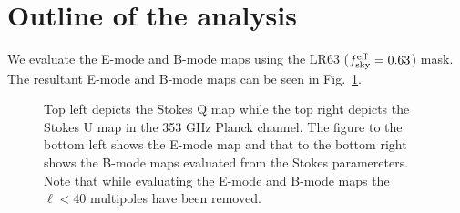 \documentclass[12pt]{article}
\begin{document}
\section{Outline of the analysis}
We evaluate the E-mode and B-mode maps using the LR63 ($f_{\rm sky}^{\rm eff}=0.63$) mask. The resultant E-mode and B-mode maps can be seen in Fig.~\ref{fig:ebmaps}.
\begin{figure}[!h]
\centering
{}
\caption{Top left depicts the Stokes Q map while the top right depicts the Stokes U map in the 353 GHz Planck channel. The figure to the bottom left shows the E-mode map and that to the bottom right shows the B-mode maps evaluated from the Stokes paramereters. Note that while evaluating the E-mode and B-mode maps the $\ell < 40$ multipoles have been removed.}
\label{fig:ebmaps}
\end{figure}
\end{document}
